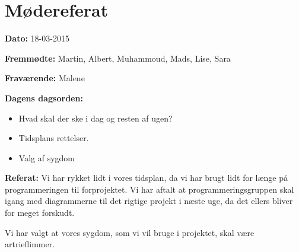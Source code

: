 \chapter{Mødereferat}

\textbf{Dato:} 18-03-2015

\textbf{Fremmødte:} Martin, Albert, Muhammoud, Mads, Lise, Sara

\textbf{Fraværende:} Malene

\textbf{Dagens dagsorden:}

\begin{itemize}
	\item Hvad skal der ske i dag og resten af ugen? 
	\item Tidsplans rettelser. 
	\item Valg af sygdom
\end{itemize}

\textbf{Referat:}
Vi har rykket lidt i vores tidsplan, da vi har brugt lidt for længe på programmeringen til forprojektet. Vi har aftalt at programmeringsgruppen skal igang med diagrammerne til det rigtige projekt i næste uge, da det ellers bliver for meget forskudt. 

Vi har valgt at vores sygdom, som vi vil bruge i projektet, skal være artrieflimmer. 